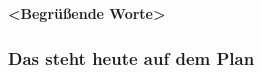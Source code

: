 \documentclass[
    ngerman,
    accentcolor=3b,
    fontsize= 12pt,
    a4paper,
    aspectratio=169,
    colorback=true,
    fancy_row_colors,
    leqno,
    fleqn,
    boxarc=3pt,
    fleqn,
    main,
]{algoslides}
\subtitle{<Subtitel>}
\author{<Autor1>\and<Autor2>}
\title[\shortworkshoptitle{}]{\workshoptitle{}}
\date{\today}
\def\gruesswoerte{<Begrüßende Worte>}
\begin{document}

    \maketitle{}

    \begin{frame}[c]
        \centering\huge\textbf{\gruesswoerte{}}
    \end{frame}


    \begin{frame}
        \frametitle{Das steht heute auf dem Plan}
        \tableofcontents[subsubsectionstyle=hide]
    \end{frame}



    
\end{document}
